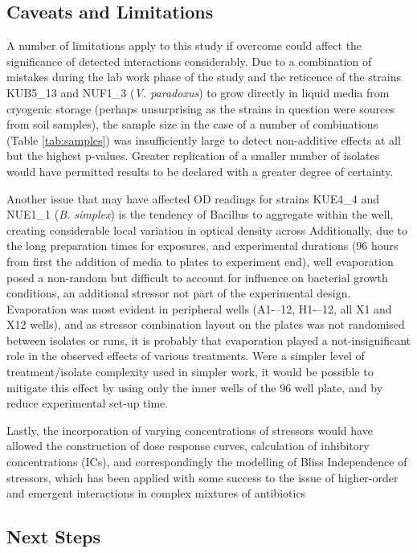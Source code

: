 \documentclass[final,1p,times]{elsarticle}
\begin{document}
\subsection{Caveats and Limitations}
\label{S:4:3}

A number of limitations apply to this study if overcome could affect the significance of detected interactions considerably.  Due to a combination of mistakes during the lab work phase of the study and the reticence of the strains KUB5\_13 and NUF1\_3 (\textit{V. paradoxus}) to grow directly in liquid media from cryogenic storage (perhaps unsurprising as the strains in question were sources from soil samples), the sample size in the case of a number of combinations (Table \ref{tab:samples}) was insufficiently large to detect non-additive effects at all but the highest p-values.  Greater replication of a smaller number of isolates would have permitted results to be declared with a greater degree of certainty. 

Another issue that may have affected OD readings for strains KUE4\_4 and NUE1\_1 (\textit{B. simplex}) is the tendency of Bacillus to aggregate within the well, creating considerable local variation in optical density across 
Additionally, due to the long preparation times for exposures, and experimental durations (96 hours from first the addition of media to plates to experiment end), well evaporation posed a non-random but difficult to account for influence on bacterial growth conditions, an additional stressor not part of the experimental design. Evaporation was most evident in peripheral wells (A1-–12, H1-–12, all X1 and X12 wells), and as stressor combination layout on the plates was not randomised between isolates or runs, it is probably that evaporation played a not-insignificant role in the observed effects of various treatments. Were a simpler level of treatment/isolate complexity used in simpler work, it would be possible to mitigate this effect by using only the inner wells of the 96 well plate, and by reduce experimental set-up time. 

Lastly, the incorporation of varying concentrations of stressors would have allowed the construction of dose response curves, calculation of inhibitory concentrations (ICs), and correspondingly the modelling of Bliss Independence \cite{Bliss1939} of stressors, which has been applied with some success to the issue of higher-order and emergent interactions in complex mixtures of antibiotics \cite{Beppler2016UncoveringStressors,Tekin2017PrevalenceInteractions} 
\subsection{Next Steps}
\label{S:4:4}
\end{document}
